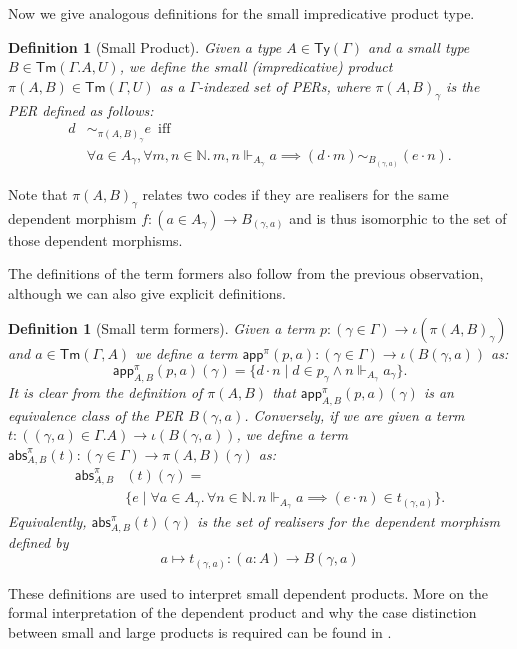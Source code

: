 \documentclass[10pt,a4paper]{article}
\newtheorem{definition}[theorem]{Definition}
\theoremstyle{definition}
\theoremstyle{remark}
\renewcommand{\.}{.\,} %
\renewcommand{\:}{:} %
\newcommand{\bN}{\mathbb{N}}
\newcommand{\0}{\mathbf{0}}
\newcommand{\1}{\mathbf{1}}
\newcommand\<\langle
\renewcommand\>\rangle
\newcommand{\app}{\mathsf{app}}
\newcommand{\abs}{\mathsf{abs}}
\newcommand{\Ty}{\mathsf{Ty}}
\newcommand{\Tm}{\mathsf{Tm}}
\newcommand{\U}{U}
\newcommand{\Iff}{\hspace{6pt}\text{iff}\hspace{6pt}}
\theoremstyle{remark}
\begin{document}
Now we give analogous definitions for the small impredicative product type.
\begin{definition}[Small Product]
	Given a type $A \in \Ty(\Gamma)$ and a small type $B \in \Tm(\Gamma.A, \U)$, we define the small (impredicative) product $\pi(A, B) \in \Tm(\Gamma, \U)$ as a $\Gamma$-indexed set of PERs, where $\pi (A, B)_\gamma$ is the PER defined as follows:
	\begin{align*}
		d &\sim_{\pi (A, B)_\gamma} e \Iff \\ &\forall a \in A_\gamma, \forall m, n \in \bN \. m, n \Vdash_{A_\gamma} a \implies (d \cdot m) \sim_{B_{(\gamma, a)}} (e \cdot n).
	\end{align*}
\end{definition}
	Note that $\pi(A, B)_\gamma$ relates two codes if they are realisers for the same dependent morphism $f : (a \in A_\gamma) \to B_{(\gamma, a)}$ and is thus isomorphic to the set of those dependent morphisms.
    
    The definitions of the term formers also follow from the previous observation, although we can also give explicit definitions.
\begin{definition}[Small term formers]
	Given a term $p : (\gamma \in \Gamma) \to \iota(\pi(A, B)_\gamma)$ and $a \in \Tm(\Gamma, A)$ we define a term $\app^\pi(p, a) :(\gamma \in \Gamma) \to \iota(B(\gamma, a))$ as:
	\[
	\app_{A, B}^\pi(p, a)(\gamma) = \{ d \cdot n \mid d \in p_\gamma \land n \Vdash_{A_\gamma} a_\gamma\}.
	\]
	It is clear from the definition of $\pi(A, B)$ that $\app_{A, B}^\pi(p, a)(\gamma)$ is an equivalence class of the PER $B(\gamma, a)$. 
	Conversely, if we are given a term $t : ((\gamma, a) \in \Gamma.A) \to \iota(B(\gamma, a))$, we define a term $\abs^\pi_{A, B}(t) : (\gamma \in \Gamma) \to \pi(A, B)(\gamma)$ as:
	\begin{align*}
		\abs_{A, B}^\pi&(t)(\gamma) = \\
		&\{ e \mid \forall a \in A_\gamma \. \forall n \in \bN \. n \Vdash_{A_\gamma} a \implies (e \cdot n) \in t_{(\gamma, a)} \}.
	\end{align*}
	Equivalently, $\abs_{A, B}^\pi(t)(\gamma)$ is the set of realisers for the dependent morphism defined by \[a \mapsto t_{(\gamma, a)} : (a : A) \to B(\gamma, a)\]
\end{definition}
These definitions are used to interpret small dependent products. More on the formal interpretation of the dependent product and why the case distinction between small and large products is required can be found in \cite{REUS1999128}.
\end{document}
